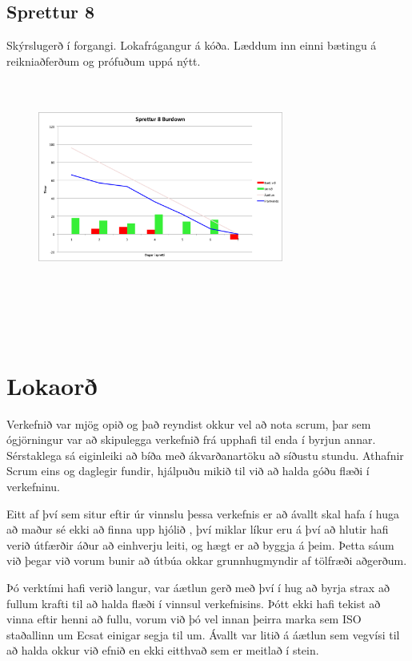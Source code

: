 \documentclass{article}
\begin{document}
\subsection{Sprettur 8}
Skýrslugerð í forgangi. Lokafrágangur á kóða. Læddum inn einni
bætingu á reikniaðferðum og prófuðum uppá nýtt.
\hfil \\
\hfil \\
\hfil \\
\begin{figure}[H]
 \centering
 \includegraphics[width=0.72\textwidth]{Sprettur8_Burndown.png}
 \caption{}
\label{fig:sp8}
\end{figure}

\hfil \\
\hfil \\
\hfil \\
\hfil \\

\section{Lokaorð}
Verkefnið var mjög opið og það reyndist okkur vel að nota scrum, þar sem ógjörningur var að skipulegga verkefnið frá upphafi 
til enda í byrjun annar. Sérstaklega sá eiginleiki að bíða með ákvarðanartöku að síðustu stundu. 
Athafnir Scrum eins og daglegir fundir, hjálpuðu mikið til við að halda góðu flæði í verkefninu.

Eitt af því sem situr eftir úr vinnslu þessa verkefnis er að ávallt skal hafa í huga að maður sé ekki að finna upp hjólið , því miklar líkur eru á því 
að hlutir hafi verið útfærðir áður að einhverju leiti, og hægt er að byggja á þeim. Þetta sáum við þegar við vorum bunir að útbúa okkar grunnhugmyndir af
tölfræði aðgerðum.

Þó verktími hafi verið langur, var áætlun gerð með því í hug að byrja strax að fullum krafti til að halda flæði í vinnsul verkefnisins. Þótt ekki hafi tekist að vinna eftir henni
að fullu, vorum við þó vel innan þeirra marka sem ISO staðallinn um Ecsat einigar segja til um. 
Ávallt var litið á áætlun sem vegvísi til að halda okkur við efnið en ekki eitthvað sem er meitlað í stein.
\end{document}

